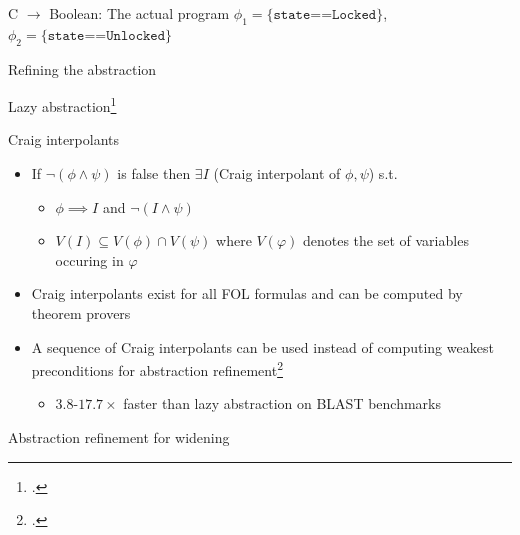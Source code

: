 \documentclass[aspectratio=169]{beamer}
\begin{document}
\begin{frame}{C $\to$ Boolean: The actual program}
  \small
  $\phi_1 = \texttt{\{state==Locked\}}$, $\phi_2 = \texttt{\{state==Unlocked\}}$\\
%       
%       
\end{frame}

\begin{frame}{Refining the abstraction}
\end{frame}

\begin{frame}{Lazy abstraction\footcite{henzinger2002lazy}}
\end{frame}

\begin{frame}{Craig interpolants}
  \begin{itemize}[<+->]
  \item If $\neg (\phi \wedge \psi)$ is false then $\exists I$ (Craig interpolant of $\phi, \psi$) s.t.
    \begin{itemize}[<+->]
    \item $\phi \implies I$ and $\neg (I \wedge \psi)$
    \item $V(I) \subseteq V(\phi) \cap V(\psi)$ where $V(\varphi)$ denotes the set of variables occuring in $\varphi$
    \end{itemize}
  \item Craig interpolants exist for all FOL formulas and can be computed by theorem provers
  \item A sequence of Craig interpolants can be used instead of computing weakest preconditions for abstraction refinement\footcite{mcmillan2006lazy}\pause
    \begin{itemize}
    \item $3.8$-$17.7\times$ faster than lazy abstraction on BLAST benchmarks
    \end{itemize}
  \end{itemize}
\end{frame}
\begin{frame}{Abstraction refinement for widening}
\end{frame}
\end{document}
